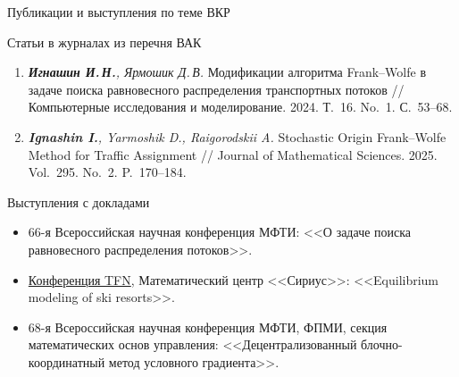 \documentclass[aspectratio=169,10pt,pdf,hyperref={unicode}]{beamer}
\begin{document}
\begin{frame}{Публикации и выступления по теме ВКР}
\scriptsize
\begin{block}{Статьи в журналах из перечня ВАК}
\begin{enumerate}
\justifying
    \item \textit{\textbf{Игнашин И.\,Н.}, Ярмошик Д.\,В.}
    Модификации алгоритма Frank--Wolfe в задаче поиска равновесного
    распределения транспортных потоков //
    Компьютерные исследования и моделирование. 2024. Т.~16. No.~1. С.~53--68.

    \item \textit{\textbf{Ignashin I.}, Yarmoshik D., Raigorodskii A.}
    Stochastic Origin Frank--Wolfe Method for Traffic Assignment //
    Journal of Mathematical Sciences. 2025. Vol.~295. No.~2. P.~170--184.
\end{enumerate}
\end{block}

\vspace{-0.05cm}
\begin{block}{Выступления с докладами}
\begin{itemize}
\justifying
    \item 66-я Всероссийская научная конференция МФТИ:
    <<О задаче поиска равновесного распределения потоков>>.
    \item \href{https://siriusmathcenter.ru/056w}{Конференция TFN},
    Математический центр <<Сириус>>:
    <<Equilibrium modeling of ski resorts>>.
    \item 68-я Всероссийская научная конференция МФТИ,
    ФПМИ, секция математических основ управления:
    <<Децентрализованный блочно-координатный метод условного градиента>>.
\end{itemize}
\end{block}
\end{frame}
\end{document}
